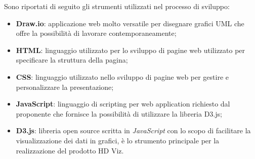 Sono riportati di seguito gli strumenti utilizzati nel processo di sviluppo:
\begin{itemize}
	\item \textbf{Draw.io}: applicazione web molto versatile per disegnare grafici UML che offre la possibilità di lavorare 
		contemporaneamente;
	\item \textbf{HTML}: linguaggio utilizzato per lo sviluppo di pagine web utilizzato per specificare la struttura della pagina;
	\item \textbf{CSS}: linguaggio utilizzato nello sviluppo di pagine web per gestire e personalizzare la presentazione;
	\item \textbf{JavaScript}: linguaggio di scripting per web application richiesto dal proponente che fornisce la possibilità di 
		utilizzare la libreria D3.js;
	\item \textbf{D3.js}: libreria open source scritta in \emph{JavaScript} con lo scopo di facilitare la visualizzazione dei dati in 
		grafici, è lo strumento principale per la realizzazione del prodotto HD Viz.
\end{itemize}
